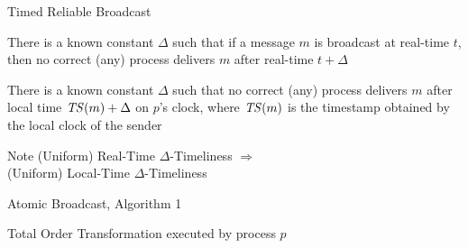 \begin{frame}{Timed Reliable Broadcast}

	
\begin{definition}
There is a known constant $\Delta$ such that if a message $m$ is broadcast at real-time $t$, then no correct (any) process delivers $m$ after 
real-time $t+\Delta$
\end{definition}

\medskip
\begin{definition}
There is a known constant $\Delta$ such that no correct (any) process delivers $m$ after local time $\mathit{TS}(m)+\Delta$ on $p$'s clock,
where $\mathit{TS}(m)$ is the timestamp obtained by the local clock of the sender
\end{definition}

\medskip
\begin{block}{Note}
(Uniform) Real-Time $\Delta$-Timeliness $\Rightarrow$\\ (Uniform) Local-Time $\Delta$-Timeliness
\end{block}
	
\end{frame}

\begin{frame}{Atomic Broadcast, Algorithm 1}
	
\begin{Procedure}
\caption{Total Order Transformation executed by process $p$}

\BlankLine
{}
\end{Procedure}
	
\end{frame}

